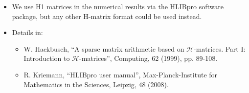 \documentclass[10pt,final,xcolor=dvipsnames]{beamer}
\begin{document}
\begin{frame}
    \vspace{0.1in}
        \begin{itemize}
        \item We use H1 matrices in the numerical results via the
          HLIBpro software package, but any other H-matrix format
          could be used instead.
        \item Details in:
          \scriptsize
          \begin{itemize}
        \item W. Hackbusch, ``A sparse matrix arithmetic based on
          $\mathcal{H}$-matrices. Part I: Introduction to $\mathcal{H}$-matrices'', Computing,
          62 (1999), pp. 89-108.
        \item  R. Kriemann,
          ``HLIBpro user manual'', Max-Planck-Institute for
          Mathematics in the Sciences, Leipzig, 48 (2008).
          \end{itemize}
        \end{itemize}
        
\end{frame}
\end{document}
